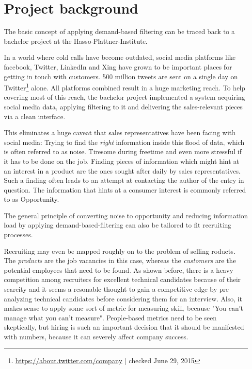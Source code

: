 \section{Project background}
The basic concept of applying demand-based filtering can be traced back to a bachelor project at the Hasso-Plattner-Institute.


In a world where cold calls have become outdated\cite{bh:2014}, social media platforms like facebook, Twitter, LinkedIn and Xing have grown to be important places for getting in touch with customers. 500 million tweets are sent on a single day on Twitter\footnote{\url{https://about.twitter.com/company} | checked June 29, 2015} alone. All platforms combined result in a huge marketing reach. To help covering most of this reach, the bachelor project implemented a system acquiring social media data, applying filtering to it and delivering the sales-relevant pieces via a clean interface.

This eliminates a huge caveat that sales representatives have been facing with social media: Trying to find the \textit{right} information inside this flood of data, which is often referred to as noise. Tiresome during freetime and even more stressful if it has to be done on the job. Finding pieces of information which might hint at an interest in a product are the ones sought after daily by sales representatives. Such a finding often leads to an attempt at contacting the author of the entry in question. The information that hints at a consumer interest is commonly referred to as Opportunity.
\newline


The general principle of converting noise to opportunity and reducing information load by applying demand-based-filtering can also be tailored to fit recruiting processes.


Recruiting may even be mapped roughly on to the problem of selling  roducts. The \textit{products} are the job vacancies in this case, whereas the \textit{customers} are the potential employees that need to be found. As shown before, there is a heavy competition among recruiters for excellent technical candidates because of their scarcity and it seems a resonable thought to gain a competitive edge by pre-analyzing technical candidates before considering them for an interview. Also, it makes sense to apply some sort of metric for measuring skill, because
"You can't manage what you can't measure"\cite{tdm:1986}.  People-based metrics need to be seen skeptically, but hiring is such an important decision that it should be manifested with numbers, because it can severely affect company success\cite{hk:1998}.